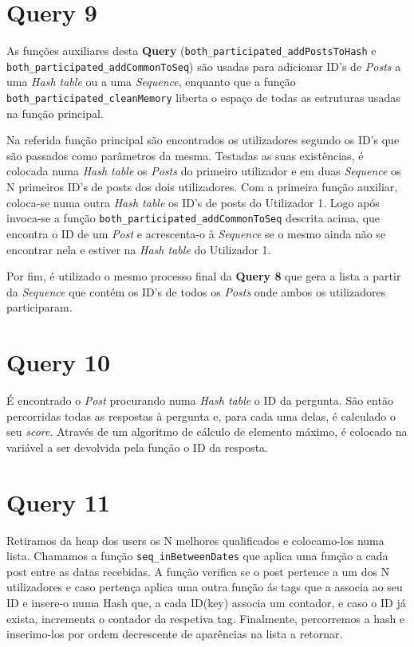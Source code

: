 \documentclass[a4paper]{report}
\begin{document}
	\section{Query 9}
	\tab As funções auxiliares desta \textbf{Query} (\verb+both_participated_addPostsToHash+ e \verb+both_participated_addCommonToSeq+) são usadas para adicionar ID's de \textit{Posts} a uma \textit{Hash table} ou a uma \textit{Sequence}, enquanto que a função \\
\verb+both_participated_cleanMemory+ liberta o espaço de todas as estruturas usadas na função principal. \par
	Na referida função principal são encontrados os utilizadores segundo os ID's que são passados como parâmetros da mesma. Testadas as suas existências, é colocada numa  \textit{Hash table} os \textit{Posts} do primeiro utilizador e em duas \textit{Sequence} os N primeiros ID's de posts dos dois utilizadores. Com a primeira função auxiliar, coloca-se numa outra \textit{Hash table} os ID's de posts do Utilizador 1. Logo após invoca-se a função \verb+both_participated_addCommonToSeq+ descrita acima, que encontra o ID de um \textit{Post} e acrescenta-o à \textit{Sequence} se o mesmo ainda não se encontrar nela e estiver na \textit{Hash table} do Utilizador 1. \par
	Por fim, é utilizado o mesmo processo final da \textbf{Query 8} que gera a lista a partir da \textit{Sequence} que contém os ID's de todos os \textit{Posts} onde ambos os utilizadores participaram.

	\section{Query 10}
	\tab É encontrado o \textit{Post} procurando numa \textit{Hash table} o ID da pergunta. São então percorridas todas as respostas à pergunta e, para cada uma delas, é calculado o seu \textit{score}. Através de um algoritmo de cálculo de elemento máximo, é colocado na variável a ser devolvida pela função o ID da resposta.

	\section{Query 11}
	\tab Retiramos da heap dos users os N melhores qualificados e colocamo-los numa lista. Chamamos a função \verb+seq_inBetweenDates+  que aplica uma função a cada post entre as datas recebidas. A função verifica se o post pertence a um dos N utilizadores e caso pertença aplica uma outra função ás tags que a associa ao seu ID e insere-o numa Hash que, a cada ID(key) associa um contador, e caso o ID já exista, incrementa o contador da respetiva tag. Finalmente, percorremos a hash e inserimo-los por ordem decrescente de aparências na lista a retornar.
\end{document}
